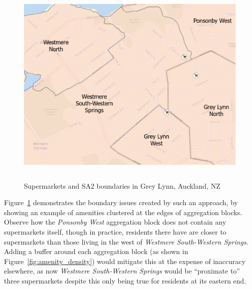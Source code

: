 \documentclass[12pt,a4paper]{article}
\begin{document}
\begin{figure}[!htbp]
	\begin{center}
		\includegraphics[height=100mm]{./figures/supermarkets_grey_lynn.PNG}
		\caption{Supermarkets and SA2 boundaries in Grey Lynn, Auckland, NZ}
		\label{fig:grey_lynn}
	\end{center}
\end{figure}

Figure~\ref{fig:grey_lynn} demonstrates the boundary issues created by such an approach, by showing an example of amenities clustered at the edges of aggregation blocks. Observe how the \emph{Ponsonby West} aggregation block does not contain any supermarkets itself, though in practice, residents there have are closer to supermarkets than those living in the west of \emph{Westmere South-Western Springs}. Adding a buffer around each aggregation block (as shown in Figure~\ref{fig:amenity_density}) would mitigate this at the expense of inaccuracy elsewhere, as now \emph{Westmere South-Western Springs} would be ``proximate to'' three supermarkets despite this only being true for residents at its eastern end.
\end{document}
